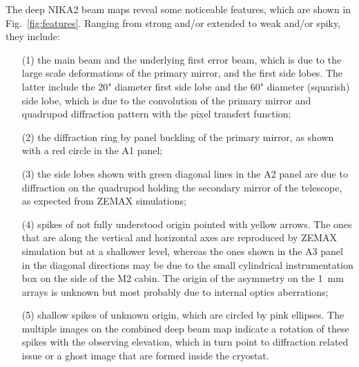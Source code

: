 The deep NIKA2 beam maps reveal some noticeable features, which are
shown in Fig.~\ref{fig:features}. Ranging from strong and/or extended to
weak and/or spiky, they include:
\begin{itemize}
\item[(1)] the main beam and the underlying first error
  beam, which is due to the large scale deformations of the primary
  mirror, and the first side lobes. The latter include 
  the 20" diameter first side lobe and the 60" diameter (squarish)
  side lobe, which is due to the convolution of the primary mirror and quadrupod
  diffraction pattern with the pixel transfert function;
\item[(2)] the diffraction ring by panel buckling of the primary
  mirror, as shown with a red circle in the A1 panel;
\item[(3)] the side lobes shown with green
  diagonal lines in the A2 panel are due to diffraction on the
  quadrupod holding the secondary mirror of the telescope, as expected
  from ZEMAX simulations;  
\item[(4)] spikes of not fully understood origin pointed with yellow
  arrows. The ones that are along the vertical and
  horizontal axes are reproduced by ZEMAX simulation but at a 
  shallower level, whereas the ones shown in the A3 panel in the
  diagonal directions may be due to the small cylindrical
  instrumentation box on the side of the M2 cabin. The origin of the
  asymmetry on the 1~mm arrays is unknown but most probably due to
  internal optics aberrations;
\item[(5)] shallow spikes of unknown origin, which are circled by pink
  ellipses. The multiple images on the combined deep beam map indicate
  a rotation of these spikes with the observing elevation, which in
  turn point to diffraction related issue or a ghost image that are
  formed inside the cryostat.
\end{itemize}

